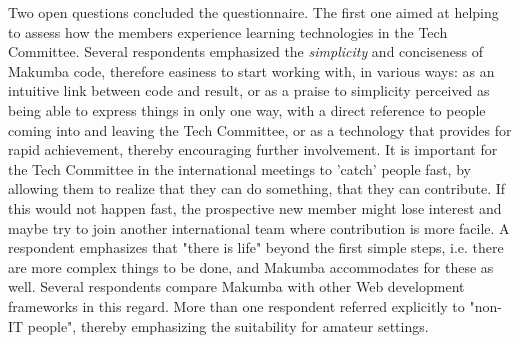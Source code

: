 \documentclass{llncs}
\begin{document}
Two open questions concluded the questionnaire. The first one aimed at helping to assess how the members experience learning technologies in the Tech Committee. Several respondents emphasized the \textit{simplicity} and conciseness of Makumba code, therefore easiness to start working with, in various ways: as an intuitive link between code and result,  or as a praise to simplicity perceived as being able to express things in only one way, with a direct reference to people coming into and leaving the Tech Committee,  or as a technology that provides for rapid achievement, thereby encouraging further involvement. It is important for the Tech Committee in the international meetings to 'catch' people fast, by allowing them to realize that they can do something, that they can contribute. If this would not happen fast, the prospective new member might lose interest and maybe try to join another international team where contribution is more facile. A respondent emphasizes that "there is life" beyond the first simple steps, i.e. there are more complex things to be done, and Makumba accommodates for these as well. Several respondents compare Makumba with other Web development frameworks in this regard. More than one respondent referred explicitly to "non-IT people", thereby emphasizing the suitability for amateur settings.



\end{document}
